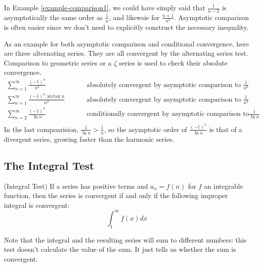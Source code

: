 \documentclass[fleqn,letterpaper]{report}
\begin{document}
In Example \ref{example-comparison1}, we could have
simply said that $\frac{1}{n-2}$ is asymptotically the same
order as $\frac{1}{n}$, and likewsie for $\frac{n+1}{n^2}$.
Asymptotic comparison is often easier since we don't need to
explicitly construct the necessary inequality.

\begin{example}As an example for both asymptotic comparison
and conditional convergence, here are three alternating
series. They are all convergent by the alternating series
test. Comparison to geometric series or a $\zeta$ series is used
to check their absolute convergence.
\begin{align*}
\sum_{n=1}^\infty \frac{(-1)^n}{n^6} & \hspace{1cm}
\text{absolutely convergent by asymptotic comparison to }
\frac{1}{n^6} \\
\sum_{n=1}^\infty \frac{(-1)^n \arctan n}{n^2} & \hspace{1cm}
\text{absolutely convergent by asymptotic comparison to }
\frac{1}{n^2} \\
\sum_{n=2}^\infty \frac{(-1)^n}{\ln n} & \hspace{1cm}
\text{conditionally convergent by asymptotic comparison to}
\frac{1}{\ln n} \\
\end{align*}
In the last compoarision, $\frac{1}{\ln n} > \frac{1}{n}$, so
the asymptotic order of $\frac{(-1)^n}{\ln n}$ is that of a
divergent series, growing faster than the harmonic series. 
\end{example}

\subsection{The Integral Test}
\label{integral-test}

\begin{prop}
(Integral Test) If a series has positive terms and
$a_n = f(n)$ for $f$ an integrable function, then the series is
convergent if and only if the following improper integral is convergent:
\begin{equation*}
\int_1^\infty f(x) dx 
\end{equation*}
\end{prop}

Note that the integral and the resulting series will sum to
different numbers: this test doesn't calculate the value of
the sum. It just tells us whether the sum is convergent. 
\end{document}
